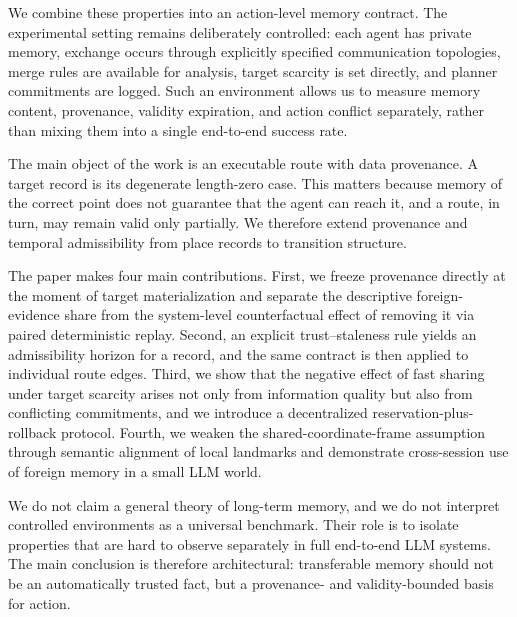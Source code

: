 \documentclass{article}
\begin{document}
We combine these properties into an action-level memory contract. The experimental setting remains deliberately controlled: each agent has private memory, exchange occurs through explicitly specified communication topologies, merge rules are available for analysis, target scarcity is set directly, and planner commitments are logged. Such an environment allows us to measure memory content, provenance, validity expiration, and action conflict separately, rather than mixing them into a single end-to-end success rate.

The main object of the work is an executable route with data provenance. A target record is its degenerate length-zero case. This matters because memory of the correct point does not guarantee that the agent can reach it, and a route, in turn, may remain valid only partially. We therefore extend provenance and temporal admissibility from place records to transition structure.

The paper makes four main contributions. First, we freeze provenance directly at the moment of target materialization and separate the descriptive foreign-evidence share from the system-level counterfactual effect of removing it via paired deterministic replay. Second, an explicit trust--staleness rule yields an admissibility horizon for a record, and the same contract is then applied to individual route edges. Third, we show that the negative effect of fast sharing under target scarcity arises not only from information quality but also from conflicting commitments, and we introduce a decentralized reservation-plus-rollback protocol. Fourth, we weaken the shared-coordinate-frame assumption through semantic alignment of local landmarks and demonstrate cross-session use of foreign memory in a small LLM world.

We do not claim a general theory of long-term memory, and we do not interpret controlled environments as a universal benchmark. Their role is to isolate properties that are hard to observe separately in full end-to-end LLM systems. The main conclusion is therefore architectural: transferable memory should not be an automatically trusted fact, but a provenance- and validity-bounded basis for action.
\end{document}

